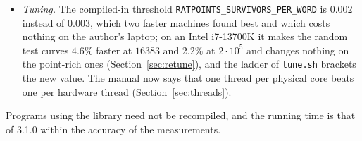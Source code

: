 \documentclass[12pt,a4paper,oneside]{amsart}
\begin{document}
\begin{itemize}
        them by brute force (Section~\ref{sec:tests}). \texttt{bench\_init}
        builds again, and \texttt{make test} runs its check of the sieve
        tables (\texttt{testinit}).
  \item \emph{Tuning.} The compiled-in threshold
        \texttt{RATPOINTS\_SURVIVORS\_PER\_WORD} is $0.002$ instead of
        $0.003$, which two faster machines found best and which costs nothing
        on the author's laptop; on an Intel i7-13700K it makes the random test
        curves $4.6\%$ faster at $16383$ and $2.2\%$ at $2\cdot10^5$ and
        changes nothing on the point-rich ones (Section~\ref{sec:retune}), and
        the ladder of \texttt{tune.sh} brackets the new value. The manual now
        says that one thread per physical core beats one per hardware thread
        (Section~\ref{sec:threads}).
\end{itemize}
Programs using the library need not be recompiled, and the running time is
that of 3.1.0 within the accuracy of the measurements.
\end{document}
